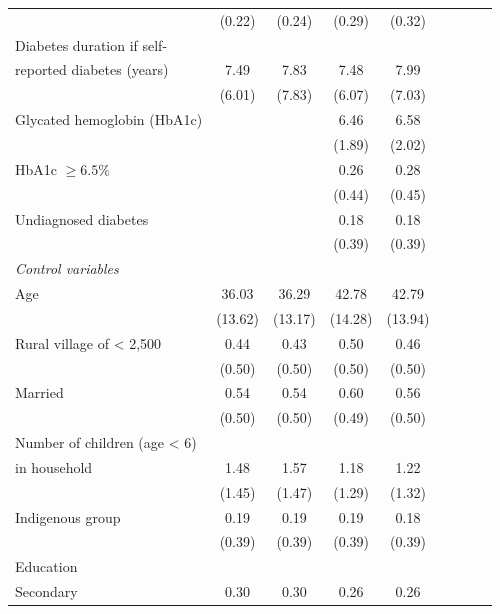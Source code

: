 \documentclass[12pt,english]{article}
\begin{document}
\begin{table}[p]
\begin{adjustbox}{max width=0.7\linewidth, center}
\begin{threeparttable}
{\begin{tabular}{l*{4}{SS}}
                    &      (0.22)&      (0.24)&      (0.29)&      (0.32)\\
Diabetes duration if self- &&&&\\
reported diabetes (years)   &        7.49&        7.83&        7.48&        7.99\\
                    &      (6.01)&      (7.83)&      (6.07)&      (7.03)\\
Glycated hemoglobin (HbA1c)&            &            &       6.46&        6.58\\
                    &            &            &      (1.89)&      (2.02)\\
HbA1c $\geq 6.5\%$  &            &            &        0.26&        0.28\\
                    &            &            &      (0.44)&      (0.45)\\
Undiagnosed diabetes&            &            &        0.18&        0.18\\
                    &            &            &      (0.39)&      (0.39)\\
\hspace*{10mm}\emph{Control variables} \\
Age                 &       36.03&       36.29&       42.78&       42.79\\
                    &     (13.62)&     (13.17)&     (14.28)&     (13.94)\\
Rural village of < 2,500&        0.44&        0.43&        0.50&        0.46\\
                    &      (0.50)&      (0.50)&      (0.50)&      (0.50)\\
Married             &        0.54&        0.54&        0.60&        0.56\\
                    &      (0.50)&      (0.50)&      (0.49)&      (0.50)\\
Number of children (age < 6) &&&&\\
in household&        1.48&        1.57&        1.18&        1.22\\
                    &      (1.45)&      (1.47)&      (1.29)&      (1.32)\\
Indigenous group    &        0.19&        0.19&        0.19&        0.18\\
                    &      (0.39)&      (0.39)&      (0.39)&      (0.39)\\
Education &&&& \\                    
\hspace*{10mm}Secondary           &        0.30&        0.30&        0.26&        0.26\\

\end{tabular}}
\end{threeparttable}
\end{adjustbox}
\end{table}
\end{document}
